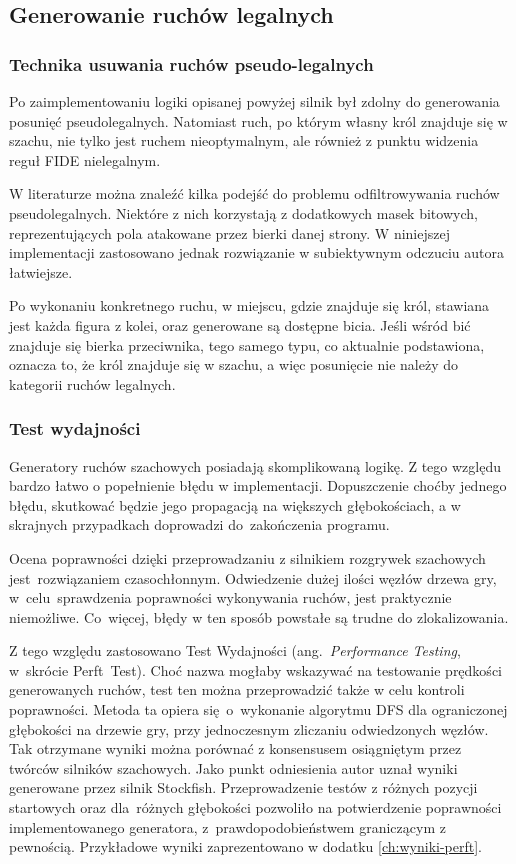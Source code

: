 \subsection{Generowanie ruchów legalnych}
\label{subsec:generowanie-ruchow-legalnych}

\subsubsection{Technika usuwania ruchów pseudo-legalnych}

Po zaimplementowaniu logiki opisanej powyżej silnik był zdolny do generowania posunięć pseudolegalnych.
Natomiast ruch, po którym własny król znajduje się w szachu, nie tylko jest ruchem nieoptymalnym, ale również z punktu widzenia reguł FIDE nielegalnym.

W literaturze można znaleźć kilka podejść do problemu odfiltrowywania ruchów pseudolegalnych.
Niektóre z nich korzystają z dodatkowych masek bitowych, reprezentujących pola atakowane przez bierki danej strony.
W niniejszej implementacji zastosowano jednak rozwiązanie w subiektywnym odczuciu autora łatwiejsze.

Po wykonaniu konkretnego ruchu, w miejscu, gdzie znajduje się król, stawiana jest każda figura z kolei, oraz generowane są dostępne bicia.
Jeśli wśród bić znajduje się bierka przeciwnika, tego samego typu, co aktualnie podstawiona, oznacza to, że król znajduje się w szachu, a więc posunięcie nie należy do kategorii ruchów legalnych.

\subsubsection{Test wydajności}

Generatory ruchów szachowych posiadają skomplikowaną logikę.
Z tego względu bardzo łatwo o popełnienie błędu w implementacji.
Dopuszczenie choćby jednego błędu, skutkować będzie jego propagacją na większych głębokościach, a w skrajnych przypadkach doprowadzi do~zakończenia programu.

Ocena poprawności dzięki przeprowadzaniu z silnikiem rozgrywek szachowych jest~rozwiązaniem czasochłonnym.
Odwiedzenie dużej ilości węzłów drzewa gry, w~celu~sprawdzenia poprawności wykonywania ruchów, jest praktycznie niemożliwe.
Co~więcej, błędy w ten sposób powstałe są trudne do zlokalizowania.

Z tego względu zastosowano Test Wydajności (ang.~\emph{Performance Testing}, w~skrócie Perft~Test).
Choć nazwa mogłaby wskazywać na testowanie prędkości generowanych ruchów, test ten można przeprowadzić także w celu kontroli poprawności.
Metoda ta opiera się~o~wykonanie algorytmu DFS dla ograniczonej głębokości na drzewie gry, przy jednoczesnym zliczaniu odwiedzonych węzłów.
Tak otrzymane wyniki można porównać z konsensusem osiągniętym przez twórców silników szachowych.
Jako punkt odniesienia autor uznał wyniki generowane przez silnik Stockfish.
Przeprowadzenie testów z różnych pozycji startowych oraz dla~różnych głębokości pozwoliło na potwierdzenie poprawności implementowanego generatora, z~prawdopodobieństwem graniczącym z pewnością.
Przykładowe wyniki zaprezentowano w dodatku \ref{ch:wyniki-perft}.

